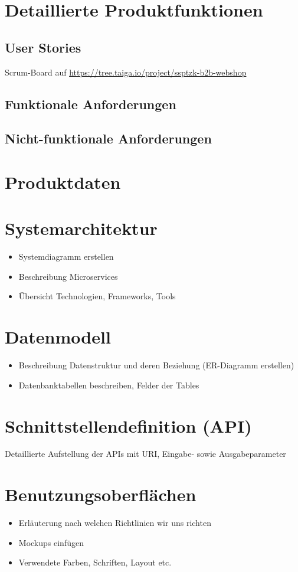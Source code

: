 \documentclass[%
	ngerman,
	12pt,
	a4paper,
	oneside
]{scrbook}
\begin{document}
\chapter{Detaillierte Produktfunktionen}
\section{User Stories}
Scrum-Board auf \url{https://tree.taiga.io/project/ssptzk-b2b-webshop}
\section{Funktionale Anforderungen}
\section{Nicht-funktionale Anforderungen}

\chapter{Produktdaten}

\chapter{Systemarchitektur}
\begin{itemize}
	\item Systemdiagramm erstellen
	\item Beschreibung Microservices
	\item Übersicht Technologien, Frameworks, Tools
\end{itemize}

\chapter{Datenmodell}
\begin{itemize}
	\item Beschreibung Datenstruktur und deren Beziehung (ER-Diagramm erstellen)
	\item Datenbanktabellen beschreiben, Felder der Tables
\end{itemize}

\chapter{Schnittstellendefinition (API)}
Detaillierte Aufstellung der APIs mit URI, Eingabe- sowie Ausgabeparameter

\chapter{Benutzungsoberflächen}
\begin{itemize}
	\item Erläuterung nach welchen Richtlinien wir uns richten
	\item Mockups einfügen
	\item Verwendete Farben, Schriften, Layout etc.
\end{itemize}
\end{document}
